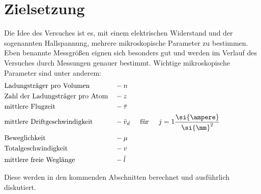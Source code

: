 \section{Zielsetzung}
\label{sec:zielsetzung}
Die Idee des Versuches ist es, mit einem elektrischen Widerstand und der sogenannten Hallspannung, mehrere mikroskopische Parameter zu bestimmen. 
Eben benannte Messgrößen eignen sich besonders gut und werden im Verlauf des Versuches durch Messungen genauer bestimmt. Wichtige mikroskopische Parameter sind unter anderem:
\begin{align*}
\label{al:Sammlung}
&\text{Ladungsträger pro Volumen } &&- n \\
&\text{Zahl der Ladungsträger pro Atom} &&- z \\
&\text{mittlere Flugzeit} &&- \bar{\tau} \\
&\text{mittlere Driftgeschwindigkeit} &&- \bar{v}_d \hspace{0.5cm}\text{für} \hspace{0.5cm} j = 1 \frac{\si{\ampere}}{{\si{\mm}}^2} \hspace{2cm}\\
&\text{Beweglichkeit} &&-\mu \\
&\text{Totalgeschwindigkeit} &&- v \\
&\text{mittlere freie Weglänge} &&- \bar{l}
\end{align*} 

\flushleft
Diese werden in den kommenden Abschnitten berechnet und ausführlich diskutiert.

